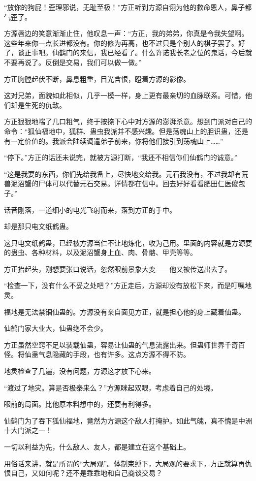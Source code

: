 \begin{this_body}
“放你的狗屁！歪理邪说，无耻至极！”方正听到方源自诩为他的救命恩人，鼻子都气歪了。

方源唇边的笑意渐渐止住，他叹息一声：“方正，我的弟弟，你真是令我失望啊。这些年来你一点长进都没有。你的修为再高，也不过只是个别人的棋子罢了。好了，谈正事吧。仙鹤门的来信，我已经看了。什么许诺我长老之位的鬼话，今后就不要再说了。反倒是交易，我们可以做一做。”

方正胸膛起伏不断，鼻息粗重，目光含恨，瞪着方源的影像。

这对兄弟，面貌如此相似，几乎一模一样，身上更有最亲切的血脉联系。可惜，他们却是生死的仇敌。

方正狠狠地喘了几口粗气，终于按捺下心中对方源的澎湃杀意。想到门派对自己的命令：“狐仙福地中，狐群、蛊虫我派并不感兴趣。但是荡魂山上的胆识蛊，还是有一定价值的。我派会陆续调遣弟子前来，你将他们接引到荡魂山上……”

“停下。”方正的话还未说完，就被方源打断，“我还不相信你们仙鹤门的诚意。”

“这是我要的东西，你们先给我备上，尽快地交给我。元石我没有，不过我却有荒兽泥沼蟹的尸体可以代替元石交易。详情都在信中。回去好好看看肥田仁医傻包子。”

话音刚落，一道细小的电光飞射而来，落到方正的手中。

却是那只电文纸鹤蛊。

这只电文纸鹤蛊，已经被方源当仁不让地炼化，收为己用。里面的内容就是方源要的蛊虫、各种材料，以及泥沼蟹身上血、肉、骨骼、甲壳等等。

方正抬起头，刚想要张口说话，忽然眼前景象大变——他又被传送出去了。

“检查一下，没有什么不妥之处吧？”方正走后，方源却没有放松下来，而是叮嘱地灵。

福地是无法禁锢仙蛊的。方源没有亲自面见方正，就是担心他的身上藏着仙蛊。

仙鹤门家大业大，仙蛊绝不会少。

方正虽然空窍不足以装载仙蛊，容易让仙蛊的气息流露出来。但蛊师世界千奇百怪。将仙蛊气息隐藏的手段，也有许多。这点方源不得不防。

地灵检查了几遍，没有问题，方源这才放下心来。

“渡过了地灾。算是否极泰来么？”方源眯起双眼，考虑着自己的处境。

眼前的局面。比他原本料想中的，还要有利得多。

仙鹤门为了吞下狐仙福地，竟然为方源这个敌人打掩护。如此气魄，真不愧是中洲十大门派之一！

一切以利益为先，什么敌人、友人，都是建立在这个基础上。

用俗话来讲，就是所谓的“大局观”。体制束缚下，大局观的要求下，方正就算再仇恨自己，又如何呢？还不是乖乖地和自己商谈交易？


\end{this_body}
